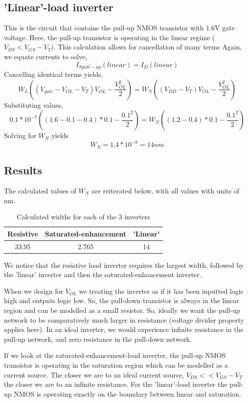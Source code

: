 \documentclass[12pt]{article}
\begin{document}
\subsection*{'Linear'-load inverter}
This is the circuit that contains the pull-up NMOS transistor with 1.6V gate voltage. Here, the pull-up transistor
is operating in the linear regime ($V_{DS} < V_{GS} - V_T$). This calculation allows for cancellation of many terms
Again, we equate currents to solve,
\[ I_{S pull-up}(linear) = I_{D}(linear)\]
Cancelling identical terms yields,
\[W_L ((V_{gate} - V_{OL} - V_T) V_{OL} - \frac{V_{OL}^2}{2}) = W_N ((V_{DD} - V_T) V_{OL} - \frac{V_{OL}^2}{2}) \]
Substituting values,
\[0.1*10^{-7} ((1.6 - 0.1 - 0.4)*0.1 - \frac{0.1^2}{2}) = W_N ((1.2 - 0.4)*0.1 - \frac{0.1^2}{2}) \]
Solving for $W_N$ yields 
\[ W_N = 1.4*10^{-8} = 14nm\]

\subsection{Results}
The calculated values of $W_N$ are reiterated below, with all values with units of nm.
\begin{table} [H]
    \centering
    \begin{tabular} {ccc} 
        Resistive & Saturated-enhancement & 'Linear'\\
        \hline
        33.95 & 2.765 & 14
    \end{tabular}
    \caption{Calculated widths for each of the 3 inverters}
\end{table}
We notice that the resistive load inverter requires the largest width, followed by the 'linear' inverter and then the saturated-enhancement inverter. 

When we
design for $V_{OL}$ we treating the inverter as if it has been inputted logic high and outputs logic low. So, the pull-down transistor is always in the linear 
region and can be modelled as a small resistor. So, ideally we want the pull-up network to be comparatively much larger in resistance (voltage divider property
applies here). In an ideal inverter, we would experience infinite resistance in the pull-up network, and zero resistance in the pull-down network.

If we look at the saturated-enhancement-load inverter, the pull-up NMOS transistor is operating in the saturation region which can be modelled as
a current source. The closer we are to an ideal current source, $V_{DS} << V_{GS} - V_T$ the closer we are to an infinite resistance. For the 'linear'-load inverter
the pull-up NMOS is operating exactly on the boundary between linear and saturation.
\end{document}

